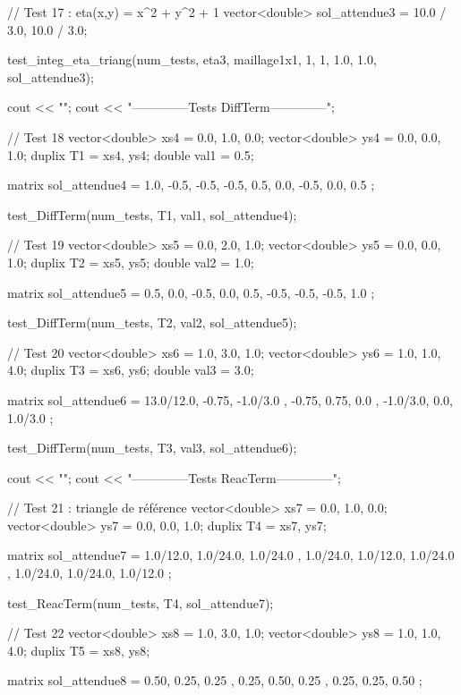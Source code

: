 \begin{codeblock}
{    // Test 17 : eta(x,y) = x^2 + y^2 + 1
    vector<double> sol_attendue3 = {10.0 / 3.0, 10.0 / 3.0};

    test_integ_eta_triang(num_tests, eta3, maillage1x1, 1, 1, 1.0, 1.0, sol_attendue3);


    cout << "\n\n\n";
    cout << "--------------Tests DiffTerm--------------\n";


    // Test 18
    vector<double> xs4 = {0.0, 1.0, 0.0};
    vector<double> ys4 = {0.0, 0.0, 1.0};
    duplix T1 = {xs4, ys4};
    double val1 = 0.5;

    matrix sol_attendue4 =  {
        { 1.0, -0.5, -0.5},
        {-0.5,  0.5,  0.0},
        {-0.5,  0.0,  0.5}
    };

    test_DiffTerm(num_tests, T1, val1, sol_attendue4);


    // Test 19
    vector<double> xs5 = {0.0, 2.0, 1.0};
    vector<double> ys5 = {0.0, 0.0, 1.0};
    duplix T2 = {xs5, ys5};
    double val2 = 1.0;

    matrix sol_attendue5 = {
        { 0.5,  0.0, -0.5},
        { 0.0,  0.5, -0.5},
        {-0.5, -0.5,  1.0}
    };

    test_DiffTerm(num_tests, T2, val2, sol_attendue5);


    // Test 20
    vector<double> xs6 = {1.0, 3.0, 1.0};
    vector<double> ys6 = {1.0, 1.0, 4.0};
    duplix T3 = {xs6, ys6};
    double val3 = 3.0;

    matrix sol_attendue6 = {
        { 13.0/12.0, -0.75, -1.0/3.0 },
        { -0.75,      0.75,  0.0 },
        { -1.0/3.0,   0.0,   1.0/3.0 }
    };

    test_DiffTerm(num_tests, T3, val3, sol_attendue6);



    cout << "\n\n\n";
    cout << "--------------Tests ReacTerm--------------\n";


    // Test 21 : triangle de référence
    vector<double> xs7 = {0.0, 1.0, 0.0};
    vector<double> ys7 = {0.0, 0.0, 1.0};
    duplix T4 = {xs7, ys7};

    matrix sol_attendue7 = {
        { 1.0/12.0, 1.0/24.0, 1.0/24.0 },
        { 1.0/24.0, 1.0/12.0, 1.0/24.0 },
        { 1.0/24.0, 1.0/24.0, 1.0/12.0 }
    };

    test_ReacTerm(num_tests, T4, sol_attendue7);


    // Test 22
    vector<double> xs8 = {1.0, 3.0, 1.0};
    vector<double> ys8 = {1.0, 1.0, 4.0};
    duplix T5 = {xs8, ys8};

    matrix sol_attendue8 = {
        { 0.50, 0.25, 0.25 },
        { 0.25, 0.50, 0.25 },
        { 0.25, 0.25, 0.50 }
    };

}
\end{codeblock}
